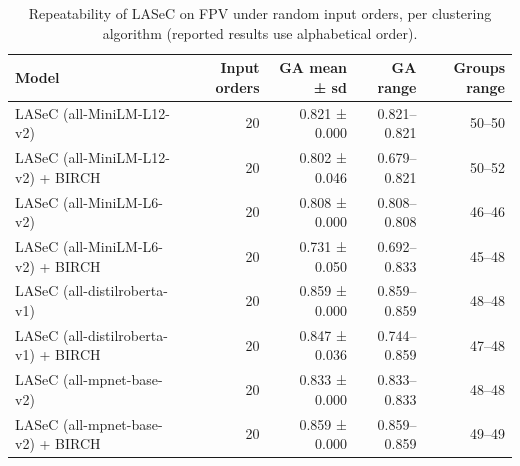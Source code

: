 \begin{table}[t]
\centering
\caption{Repeatability of LASeC on FPV under random input orders, per clustering algorithm (reported results use alphabetical order).}
\label{tab:repeatability}
\small
\begin{tabular}{lrrrr}
\toprule
Model & Input orders & GA mean ± sd & GA range & Groups range \\
\midrule
LASeC (all-MiniLM-L12-v2) & 20 & 0.821 ± 0.000 & 0.821–0.821 & 50–50 \\
LASeC (all-MiniLM-L12-v2) + BIRCH & 20 & 0.802 ± 0.046 & 0.679–0.821 & 50–52 \\
LASeC (all-MiniLM-L6-v2) & 20 & 0.808 ± 0.000 & 0.808–0.808 & 46–46 \\
LASeC (all-MiniLM-L6-v2) + BIRCH & 20 & 0.731 ± 0.050 & 0.692–0.833 & 45–48 \\
LASeC (all-distilroberta-v1) & 20 & 0.859 ± 0.000 & 0.859–0.859 & 48–48 \\
LASeC (all-distilroberta-v1) + BIRCH & 20 & 0.847 ± 0.036 & 0.744–0.859 & 47–48 \\
LASeC (all-mpnet-base-v2) & 20 & 0.833 ± 0.000 & 0.833–0.833 & 48–48 \\
LASeC (all-mpnet-base-v2) + BIRCH & 20 & 0.859 ± 0.000 & 0.859–0.859 & 49–49 \\
\bottomrule
\end{tabular}
\end{table}